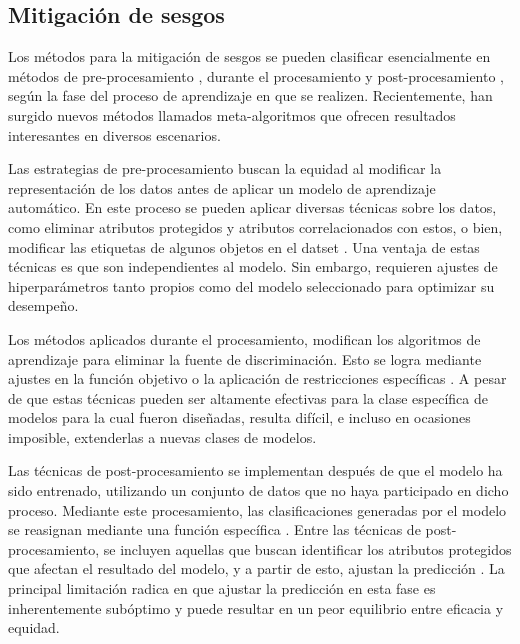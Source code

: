 \subsection{Mitigaci\'on de sesgos}

Los m\'etodos para la mitigaci\'on de sesgos se pueden clasificar esencialmente en m\'etodos de pre-procesamiento \cite{osti_10182459}, 
durante el procesamiento \parencite{ml_in_admissions} y post-procesamiento \parencite{compas}, seg\'un la fase del proceso de 
aprendizaje en que se realizen. Recientemente, han surgido nuevos m\'etodos llamados meta-algoritmos que ofrecen resultados interesantes 
en diversos escenarios.

Las estrategias de pre-procesamiento buscan la equidad al modificar la representaci\'on de los datos antes de aplicar un modelo de aprendizaje
autom\'atico. En este proceso se pueden aplicar diversas t\'ecnicas sobre los datos, como eliminar atributos protegidos y atributos correlacionados
con estos, o bien, modificar las etiquetas de algunos objetos en el datset \parencite{preproc}. Una ventaja de estas t\'ecnicas es que son independientes
al modelo. Sin embargo, requieren ajustes de hiperpar\'ametros tanto propios como del modelo seleccionado para optimizar su desempe\~no.

Los m\'etodos aplicados durante el procesamiento, modifican los algoritmos de aprendizaje para eliminar la fuente de discriminaci\'on. Esto se 
logra mediante ajustes en la funci\'on objetivo o la aplicaci\'on de restricciones espec\'ificas \parencite{donini2020empirical,zafar17a}. A pesar de 
que estas t\'ecnicas pueden ser altamente efectivas para la clase espec\'ifica de modelos para la cual fueron dise\~nadas, resulta dif\'icil, e 
incluso en ocasiones imposible, extenderlas a nuevas clases de modelos.

Las t\'ecnicas de post-procesamiento se implementan despu\'es de que el modelo ha sido entrenado, utilizando un conjunto de datos que no haya
participado en dicho proceso. Mediante este procesamiento, las clasificaciones generadas por el modelo se reasignan mediante una funci\'on 
espec\'ifica \parencite{d_Alessandro_2017}.
Entre las t\'ecnicas de post-procesamiento, se incluyen aquellas que buscan identificar los atributos protegidos que afectan el resultado del 
modelo, y a partir de esto, ajustan la predicci\'on \parencite{seymour2018bias}. La principal limitaci\'on radica en que ajustar la predicci\'on 
en esta fase es inherentemente sub\'optimo y puede resultar en un peor equilibrio entre eficacia y equidad.

